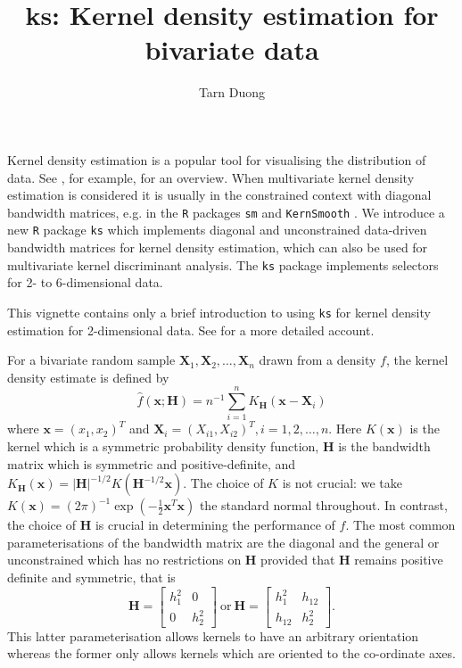 \documentclass[a4paper,11pt]{article}
\title{ks: Kernel density estimation for bivariate data}
\author{Tarn Duong}
\renewcommand{\vec}[1]{\boldsymbol{#1}}
\newcommand{\mat}[1]{\mathbf{#1}}
\def\Hmat{\mat{H}}
\def\vecx{\vec{x}}
\def\vecX{\vec{X}}
\let\proglang=\texttt
\let\pkg=\texttt
\begin{document}
\maketitle


Kernel density estimation is a popular tool for visualising 
the distribution of data. See \citet*{simonoff1996}, for example, for
an overview.
When multivariate kernel density estimation is considered it is usually
in the constrained context with diagonal bandwidth matrices, e.g. 
in the \proglang{R} packages \pkg{sm} \citep*{sm} and \pkg{KernSmooth} 
\citep*{KernSmooth}.  
We introduce a new \proglang{R} package \pkg{ks} 
which implements diagonal and unconstrained data-driven bandwidth matrices
for kernel density estimation,
which can also be used for multivariate kernel
discriminant analysis.  
The \pkg{ks} package implements selectors for  2- to 6-dimensional
data. 

This vignette contains only a brief introduction 
to using \pkg{ks} for kernel density estimation
for 2-dimensional data. 
See \citet*{duong2007c} for a more detailed account. 


For a bivariate random sample $\vecX_1, \vecX_2, \ldots, \vecX_n$ 
drawn from a density $f$, 
the kernel density estimate is defined by
$$
\hat{f} (\vecx; \Hmat) = n^{-1}\sum_{i=1}^n K_{\Hmat} ( \vecx - \vec{X}_i)
$$
where $\vecx = (x_1, x_2)^T$ and $\vec{X}_i = (X_{i1}, X_{i2})^T, i = 1, 2,  
\ldots, n$.  Here 
$K(\vecx)$ is the kernel which is a symmetric probability density function, 
$\Hmat$ 
is the bandwidth matrix which is symmetric and positive-definite,  
and $K_{\Hmat}(\vecx) = |\Hmat|^{-1/2} 
K( \Hmat^{-1/2} \vecx)$. 
The choice of $K$ is not crucial: we take 
$K(\vecx) = (2\pi)^{-1} \exp(-\tfrac{1}{2} \vecx^T \vecx)$ the standard normal
throughout.  
In contrast, the choice of $\Hmat$ is crucial in determining 
the performance of $\hat f$. 
The most common parameterisations of the bandwidth matrix
are the diagonal and the 
general or unconstrained which has no restrictions on $\Hmat$
provided that $\Hmat$
remains positive definite and symmetric, that is 
$$
\Hmat = \begin{bmatrix}h_1^2 & 0 \\0 & h_2^2 \end{bmatrix}
\ \mathrm{or} \ 
\Hmat = \begin{bmatrix}h_1^2 & h_{12} \\ h_{12}  & h_2^2 \end{bmatrix}.
$$
This latter
parameterisation allows kernels to have an arbitrary orientation
whereas the former only allows kernels which are oriented to the
co-ordinate axes.
\end{document}
